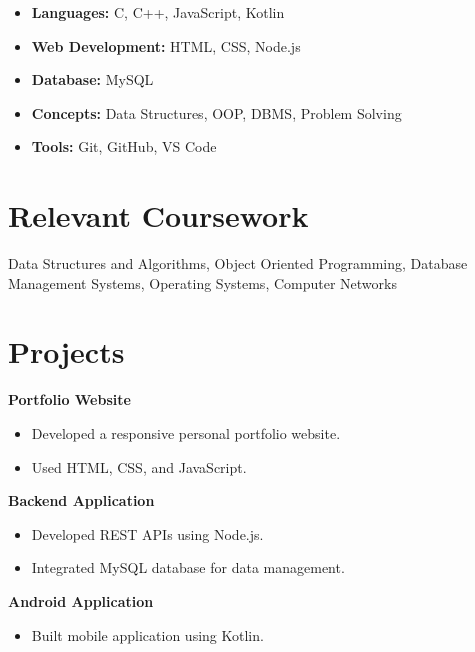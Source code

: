 \documentclass[a4paper,11pt]{article}
\begin{document}
\begin{itemize}[leftmargin=*]
    \item \textbf{Languages:} C, C++, JavaScript, Kotlin
    \item \textbf{Web Development:} HTML, CSS, Node.js
    \item \textbf{Database:} MySQL
    \item \textbf{Concepts:} Data Structures, OOP, DBMS, Problem Solving
    \item \textbf{Tools:} Git, GitHub, VS Code
\end{itemize}

\section*{Relevant Coursework}

Data Structures and Algorithms, Object Oriented Programming,
Database Management Systems, Operating Systems, Computer Networks

\section*{Projects}

\textbf{Portfolio Website}
\begin{itemize}[leftmargin=*]
    \item Developed a responsive personal portfolio website.
    \item Used HTML, CSS, and JavaScript.
\end{itemize}

\textbf{Backend Application}
\begin{itemize}[leftmargin=*]
    \item Developed REST APIs using Node.js.
    \item Integrated MySQL database for data management.
\end{itemize}

\textbf{Android Application}
\begin{itemize}[leftmargin=*]
    \item Built mobile application using Kotlin.
\end{itemize}

\end{document}
